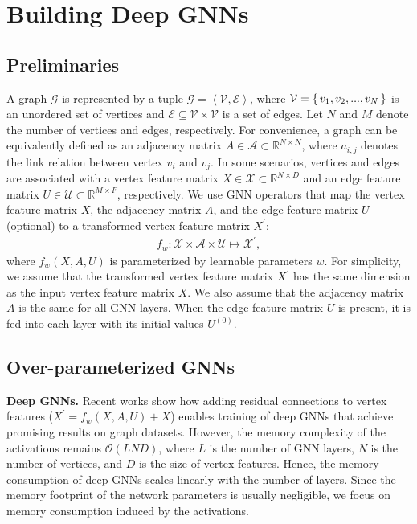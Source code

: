 \documentclass{article}
\def\Re{\mathbb{R}}
\newcommand\tuple[1]{\left\langle#1\right\rangle}
\newcommand{\mysection}[1]{\vspace{0pt}\noindent\textbf{#1.}}
\begin{document}
\section{Building Deep GNNs}
\subsection{Preliminaries}
A graph $\mathcal{G}$ is represented by a tuple $\mathcal{G} = \tuple{\mathcal{V}, \mathcal{E}}$, where $\mathcal{V} = \set{v_1, v_2, ..., v_N}$ is an unordered set of vertices and $\mathcal{E} \subseteq \mathcal{V} \times \mathcal{V}$ is a set of edges. Let $N$ and $M$ denote the number of vertices and edges, respectively. For convenience, a graph can be equivalently defined as an adjacency matrix ${A \in \mathcal{A} \subset \mathbb{R}^{N\times N}}$, where $a_{i,j}$ denotes the link relation between vertex $v_{i}$ and $v_{j}$. In some scenarios, vertices and edges are associated with a vertex feature matrix $X \in \mathcal{X} \subset \Re^{N\times D}$ and an edge feature matrix $U \in \mathcal{U} \subset \mathbb{R}^{M\times F}$, respectively.
We use GNN operators that map the vertex feature matrix $X$, the adjacency matrix $A$, and the edge feature matrix $U$ (optional) to a transformed vertex feature matrix $X^{\prime}$:
\begin{align}
f_{w}: \mathcal{X} \times \mathcal{A} \times \mathcal{U} \mapsto \mathcal{X^{\prime}},
\end{align}
where $f_{w}(X, A, U)$ is parameterized by learnable parameters $w$. For simplicity, we assume that the transformed vertex feature matrix $X^{\prime}$ has the same dimension as the input vertex feature matrix $X$. We also assume that the adjacency matrix $A$ is the same for all GNN layers. When the edge feature matrix $U$ is present, it is fed into each layer with its initial values $U^{(0)}$.

\subsection{Over-parameterized GNNs}
\mysection{Deep GNNs}  Recent works \citep{li2019deepgcns, li2020deepergcn} show how adding residual connections \citep{he2016deep} to vertex features ($X^{\prime} = f_{w}(X, A, U) + X$) enables training of deep GNNs that achieve promising results on graph datasets. 
However, the memory complexity of the activations remains $\mathcal{O}(LND)$, where $L$ is the number of GNN layers, $N$ is the number of vertices, and $D$ is the size of vertex features. Hence, the memory consumption of deep GNNs scales linearly with the number of layers. Since the memory footprint of the network parameters is usually negligible, we focus on memory consumption induced by the activations.
\end{document}
